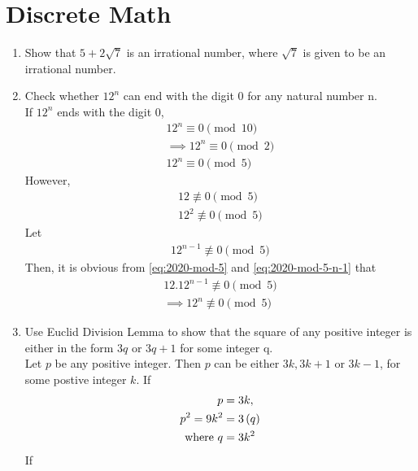 \documentclass[journal,12pt,twocolumn]{IEEEtran}
\begin{document}
\section{Discrete Math}
\begin{enumerate}
        \item Show that $5 + 2\sqrt{7}$ is an irrational number, where $\sqrt{7}$ is given to be an irrational number.\\
        \item Check whether $12^n$ can end with the digit 0 for any natural number n.\\
		\solution  If $12^n$ ends with the digit 0, 
		    \begin{align}
			    12^{n} \equiv 0 {\pmod{10}}
			    \\
			    \implies 
			    12^{n} \equiv 0 {\pmod{2}}
			    \\
			    12^{n} \equiv 0 {\pmod{5}}
		    \end{align}
		    However, 
		    \begin{align}
			    \label{eq:2020-mod-5}
			    12 \not\equiv 0 {\pmod{5}}
			    \\
			    12^2 \not\equiv 0 {\pmod{5}}
		    \end{align}
		    Let 
		    \begin{align}
			    \label{eq:2020-mod-5-n-1}
			    12^{n-1} \not \equiv 0 {\pmod{5}}
		    \end{align}
		    Then, it is obvious from
			    \eqref{eq:2020-mod-5} and 
			    \eqref{eq:2020-mod-5-n-1}
			    that 
		    \begin{align}
			    12.12^{n-1} \not \equiv 0 {\pmod{5}}
			    \\
			    \implies 
			    12^{n} \not \equiv 0 {\pmod{5}}
		    \end{align}
    \item Use Euclid Division Lemma to show that the square of any positive integer is either in the form $3q$ or $3q + 1$ for some integer q.\\
	    \solution Let $p$ be any positive integer.  Then $p$ can be either $3k, 3k+1$ or $3k-1$, for some postive integer $k$.  If
	    \begin{align}
		    p &= 3k, 
		    \\
		    p^2 = 9k^2 &= 3\left(q\right)
		    \\
		    \text{where } q &= 3k^2
	    \end{align}
	    If 
	    \begin{align}

\end{align}
\end{enumerate}
\end{document}
